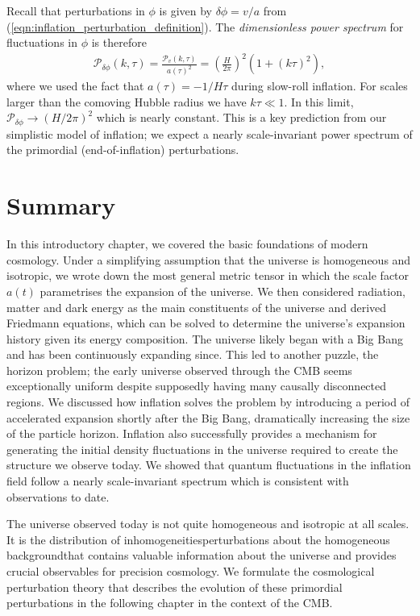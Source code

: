Recall that perturbations in $\phi$ is given by $\delta\phi = v/a$ from (\ref{eqn:inflation_perturbation_definition}). The \textit{dimensionless power spectrum} for fluctuations in $\phi$ is therefore
\begin{align}
	\mathcal{P}_{\delta\phi} (k,\tau) = \frac{\mathcal{P}_v (k,\tau)}{a(\tau)^2} = \left( \frac{H}{2\pi} \right)^2 \left(1 + (k\tau)^2 \right),
\end{align}
where we used the fact that $a(\tau) = -1/H\tau$ during slow-roll inflation. For scales larger than the comoving Hubble radius we have $k\tau \ll 1$. In this limit, $\mathcal{P}_{\delta\phi} \rightarrow (H/2\pi)^2$ which is nearly constant. This is a key prediction from our simplistic model of inflation; we expect a nearly scale-invariant power spectrum of the primordial (end-of-inflation) perturbations.


\newpage
\section*{Summary}

In this introductory chapter, we covered the basic foundations of modern cosmology. Under a simplifying assumption that the universe is homogeneous and isotropic, we wrote down the most general metric tensor in which the scale factor $a(t)$ parametrises the expansion of the universe. We then considered radiation, matter and dark energy as the main constituents of the universe and derived Friedmann equations, which can be solved to determine the universe's expansion history given its energy composition. The universe likely began with a Big Bang and has been continuously expanding since. This led to another puzzle, the horizon problem; the early universe observed through the CMB seems exceptionally uniform despite supposedly having many causally disconnected regions. We discussed how inflation solves the problem by introducing a period of accelerated expansion shortly after the Big Bang, dramatically increasing the size of the particle horizon. Inflation also successfully provides a mechanism for generating the initial density fluctuations in the universe required to create the structure we observe today. We showed that quantum fluctuations in the inflation field follow a nearly scale-invariant spectrum which is consistent with observations to date.

The universe observed today is not quite homogeneous and isotropic at all scales. It is the distribution of inhomogeneities\textemdash perturbations about the homogeneous background\textemdash that contains valuable information about the universe and provides crucial observables for precision cosmology. We formulate the cosmological perturbation theory that describes the evolution of these primordial perturbations in the following chapter in the context of the CMB.